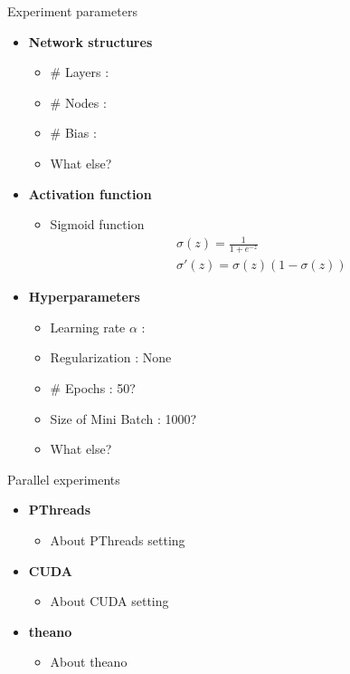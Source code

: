 \begin{frame}{Experiment parameters}
  \begin{itemize}
       \item{ \textbf{Network structures} }
     \begin{itemize}
			\item{\# Layers : }
			\item{\# Nodes : }
			\item{\# Bias : }
			\item{What else?}       
     \end{itemize}
     \item{ \textbf{Activation function}}
     \begin{itemize}
      		\item{Sigmoid function}
      		\begin{align*}
      		& \sigma(z)=\frac{1}{1+e^{-z}}\\
      		& \sigma'(z)=\sigma(z)(1-\sigma(z))
      		\end{align*}
    \end{itemize}
    \item{ \textbf{Hyperparameters} }
    \begin{itemize}
    	\item {Learning rate $\alpha$ : }
    	\item {Regularization : None }
    	\item {\# Epochs : 50? }
    	\item {Size of Mini Batch : 1000? }
    	\item {What else?}
    \end{itemize}
  \end{itemize}
\end{frame}


\begin{frame}{Parallel experiments}
	\begin{itemize}
	\item { \textbf{PThreads} }
		\begin{itemize}
		\item {About PThreads setting}
		\end{itemize}
	\item { \textbf{CUDA} }
		\begin{itemize}
		\item {About CUDA setting}
		\end{itemize}
	\item { \textbf{theano} }
		\begin{itemize}
		\item {About theano}
		\end{itemize}
	\end{itemize}

\end{frame}
